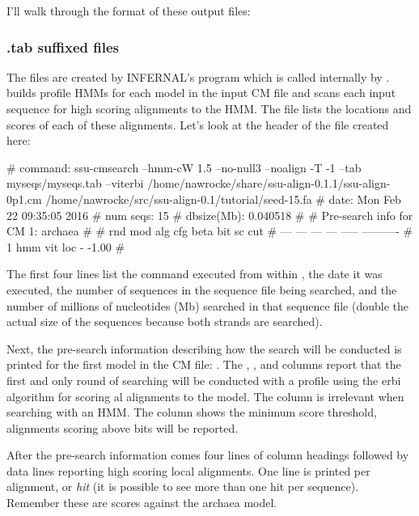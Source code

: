I'll walk through the format of these output files:

\subsubsection{.tab suffixed files}

The  files are created by INFERNAL's
 program which is called internally by
.  builds profile HMMs for each model
in the input CM file and scans each input sequence for high scoring
alignments to the HMM\@. The  file lists the locations and
scores of each of these alignments. Let's look at the header of the 
 file created here:

\begin{sreoutput}
# command:    ssu-cmsearch --hmm-cW 1.5 --no-null3 --noalign -T -1 --tab myseqs/myseqs.tab --viterbi /home/nawrocke/share/ssu-align-0.1.1/ssu-align-0p1.cm /home/nawrocke/src/ssu-align-0.1/tutorial/seed-15.fa
# date:       Mon Feb 22 09:35:05 2016
# num seqs:   15
# dbsize(Mb): 0.040518
#
# Pre-search info for CM 1: archaea
#
# rnd  mod  alg  cfg   beta  bit sc cut
# ---  ---  ---  ---  -----  ----------
#   1  hmm  vit  loc      -       -1.00
#
\end{sreoutput}

The first four lines list the  command executed from
within , the date it was executed, the number of
sequences in the sequence file being searched, and the number of
millions of nucleotides (Mb) searched in that sequence file (double the
actual size of the sequences because both strands are searched).

Next, the pre-search information describing how the search will be
conducted is printed for the first model in the CM file: . 
The , ,  and  columns report
that the first and only round of searching will be conducted with a
profile  using the erbi algorithm for scoring
al alignments to the model. The 
column is irrelevant when searching with an HMM\@. The 
column shows the minimum score threshold, alignments scoring above
 bits will be reported.

After the pre-search information comes four lines of column headings
followed by data lines reporting high scoring local alignments. One
line is printed per alignment, or \emph{hit} (it is possible to see
more than one hit per sequence). Remember these are scores against the
archaea model.

